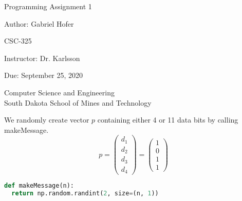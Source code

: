 \documentclass[12pt]{article}
\begin{document}
\begin{titlepage}
   \begin{center}
       \vspace*{1cm}
       \Large
       Programming Assignment 1
       \normalsize

       \vspace{0.5cm}

       Author: Gabriel Hofer

       \vspace{0.5cm}

       CSC-325

       \vspace{0.5cm}

       Instructor: Dr. Karlsson

       \vspace{0.5cm}

       Due: September 25, 2020

       \vfill

       Computer Science and Engineering\\
       South Dakota School of Mines and Technology\\
   \end{center}
\end{titlepage}


\newpage
We randomly create vector $p$ containing either 4 or 11 data bits by calling makeMessage.
\[
  p = 
  \begin{pmatrix}
    d_1 \\
    d_2 \\
    d_3 \\
    d_4
  \end{pmatrix}
  =
  \begin{pmatrix}
    1 \\
    0 \\
    1 \\
    1
  \end{pmatrix}
\]
\begin{lstlisting}[frame=single,language=Python,caption=makeMessage \label{code:makeMessage}]
def makeMessage(n): 
  return np.random.randint(2, size=(n, 1))
\end{lstlisting}
\end{document}
